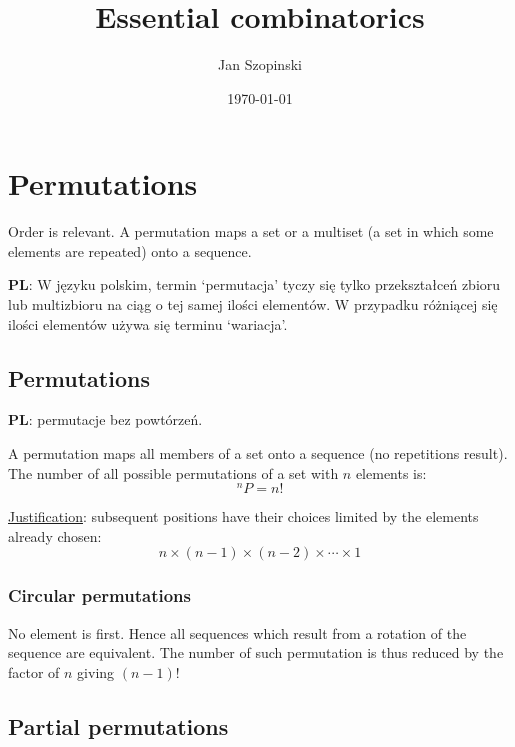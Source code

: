 \documentclass{article}
\newcommand{\pl}{\textbf{PL}: }
\begin{document}
\title{Essential combinatorics}
\author{Jan Szopinski}
\date{\frontdate\today}
\maketitle

\section{Permutations}

Order is relevant. A permutation maps a set or a multiset (a set in which some elements are repeated) onto a sequence.

\begin{otherlanguage}{polish}
    \pl
    W języku polskim, termin `permutacja' tyczy się tylko przekształceń zbioru lub multizbioru na ciąg o tej samej ilości elementów.
    W przypadku różniącej się ilości elementów używa się terminu `wariacja'.
\end{otherlanguage}

\subsection{Permutations}

\foreignlanguage{polish}{\pl permutacje bez powtórzeń.}

A permutation maps all members of a set onto a sequence (no repetitions result).
The number of all possible permutations of a set with $n$ elements is:
%
\begin{equation}
    ^nP = n!
\end{equation}

\underline{Justification}: subsequent positions have their choices limited by the elements already chosen:
%
\begin{equation*}
    n\times(n-1)\times(n-2)\times \dotsb \times 1
\end{equation*}

\subsubsection{Circular permutations}

No element is first.
Hence all sequences which result from a rotation of the sequence are equivalent.
The number of such permutation is thus reduced by the factor of $n$ giving ${(n-1)!}$

\subsection{Partial permutations}
\end{document}
